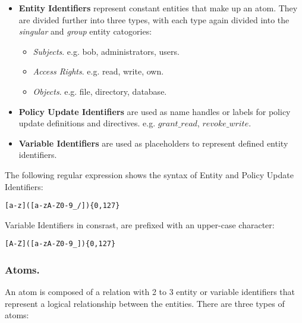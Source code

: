 \documentclass[11pt]{llncs}
\begin{document}
        \begin{itemize}
          \item
            {\bf Entity Identifiers} represent constant entities that make
            up an atom. They are divided further into three types, with each
            type again divided into the {\em singular} and {\em group} entity
            catogories:
 
            \begin{itemize}
              \item
                {\em Subjects}. e.g. bob, administrators, users.
              \item
                {\em Access Rights}. e.g. read, write, own.
              \item
                {\em Objects}. e.g. file, directory, database.
            \end{itemize}
          \vspace{1mm}
          \item
            {\bf Policy Update Identifiers} are used as name handles or labels
            for policy update definitions and directives. e.g. $grant\_read$,
            $revoke\_write$.
 
          \vspace{1mm}
          \item
            {\bf Variable Identifiers} are used as placeholders to represent
            defined entity identifiers.
        \end{itemize}
 
        The following regular expression shows the syntax of Entity and
        Policy Update Identifiers:
 
        \begin{verbatim}[a-z]([a-zA-Z0-9_/]){0,127}\end{verbatim}
 
        Variable Identifiers in consrast, are prefixed with an upper-case
        character:
 
        \begin{verbatim}[A-Z]([a-zA-Z0-9_]){0,127}\end{verbatim}

      \subsubsection{Atoms.}

        An atom is composed of a relation with 2 to 3 entity or variable
        identifiers that represent a logical relationship between the entities.
        There are three types of atoms:
\end{document}
